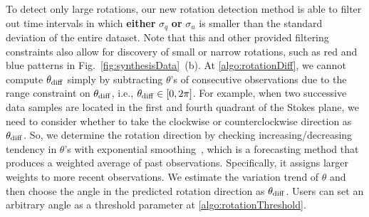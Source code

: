 %
To detect only large rotations, 
our new rotation detection method is able to filter out time intervals in which \textbf{either} $\sigma_{q}$ \textbf{or} $ \sigma_{u}$ is smaller than the standard deviation of the entire dataset. %
Note that this and other provided filtering constraints also allow for discovery of small or narrow rotations, such as red and blue patterns in Fig.~\ref{fig:synthesisData}~(b).
%
At \ref{algo:rotationDiff}, we cannot compute $\theta_{\rm diff}$ simply by subtracting $\theta$'s of consecutive observations 
due to the range constraint on $\theta_{\rm diff}$, i.e., $\theta_{\rm diff} \in [0, 2\pi]$. 
For example, when two successive data samples are located in the first and fourth quadrant of the Stokes plane, 
we need to consider whether to take the clockwise or counterclockwise direction as $\theta_{\rm diff}$. 
So, we determine the rotation direction 
by checking increasing/decreasing tendency in $\theta$'s with exponential smoothing~\cite{Brown1956},
which is a forecasting method
that produces a weighted average of past observations. 
Specifically, it assigns larger weights to more recent observations.
We estimate the variation trend of $\theta$ and
then choose the angle in the predicted rotation direction as $\theta_{\rm diff}$.
Users can set an arbitrary angle as a threshold parameter at \ref{algo:rotationThreshold}.

